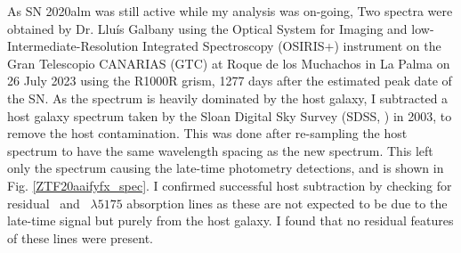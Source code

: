 \documentclass[a4paper,oneside,12pt, class=Latex/Classes/PhDthesisPSnPDF, crop=false]{standalone}
\begin{document}
As SN 2020alm was still active while my analysis was on-going, Two spectra were obtained by Dr. Lluís Galbany using the Optical System for Imaging and low-Intermediate-Resolution Integrated Spectroscopy (OSIRIS+) instrument on the Gran Telescopio CANARIAS (GTC) at Roque de los Muchachos in La Palma on 26 July 2023 using the R1000R grism, 1277 days after the estimated peak date of the SN. As the spectrum is heavily dominated by the host galaxy, I subtracted a host galaxy spectrum taken by the Sloan Digital Sky Survey (SDSS, \citealt{SDSS-I-II, SDSS_DR4, SDSS_telescope, SDSS_Spectograph}) in 2003, to remove the host contamination. This was done after re-sampling the host spectrum to have the same wavelength spacing as the new spectrum. This left only the spectrum causing the late-time photometry detections, and is shown in Fig. \ref{ZTF20aaifyfx_spec}. I confirmed successful host subtraction by checking for residual \NaID~and \MgI~${\lambda5175}$ absorption lines as these are not expected to be due to the late-time signal but purely from the host galaxy. I found that no residual features of these lines were present.
\end{document}

